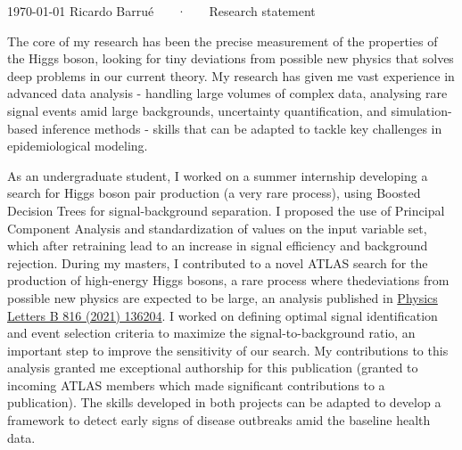 \documentclass[11pt, a4paper]{awesome-cv}
\begin{document}
\makecvheader[R]

\makecvfooter
  {\today}
  {Ricardo Barrué ~~~·~~~ Research statement}
  {}

\makelettertitle

\begin{cvletter}

The core of my research has been the precise measurement of the properties of the Higgs boson, looking for tiny deviations from possible new physics that solves deep problems in our current theory. My research has given me vast experience in advanced data analysis - handling large volumes of complex data, analysing rare signal events amid large backgrounds, uncertainty quantification, and simulation-based inference methods - skills that can be adapted to tackle key challenges in epidemiological modeling.


As an undergraduate student, I worked on a summer internship developing a search for Higgs boson pair production (a very rare process), using Boosted Decision Trees for signal-background separation. I proposed the use of Principal Component Analysis and standardization of values on the input variable set, which after retraining lead to an increase in signal efficiency and background rejection. During my masters, I contributed to a novel ATLAS search for the production of high-energy Higgs bosons, a rare process where thedeviations from possible new physics are expected to be large, an analysis published in \href{https://doi.org/10.1016/j.physletb.2021.136204}{Physics Letters B 816 (2021) 136204}. I worked on defining optimal signal identification and event selection criteria to maximize the signal-to-background ratio, an important step to improve the sensitivity of our search. My contributions to this analysis granted me exceptional authorship for this publication (granted to incoming ATLAS members which made significant contributions to a publication). The skills developed in both projects can be adapted to develop a framework to detect early signs of disease outbreaks amid the baseline health data. %


\end{cvletter}
\end{document}
